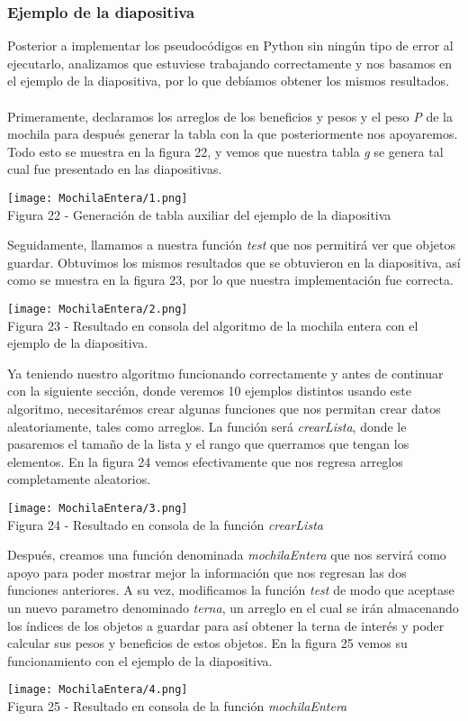 \documentclass[12pt,twoside]{article}
\begin{document}
\subsubsection{Ejemplo de la diapositiva}
Posterior a implementar los pseudocódigos en Python sin ningún tipo de error al ejecutarlo, analizamos que estuviese trabajando correctamente y nos basamos en el ejemplo de la diapositiva, por lo que debíamos obtener los mismos resultados.\\\\
Primeramente, declaramos los arreglos de los beneficios y pesos y el peso \textit{P} de la mochila para después generar la tabla con la que posteriormente nos apoyaremos. Todo esto se muestra en la figura 22, y vemos que nuestra tabla \textit{g} se genera tal cual fue presentado en las diapositivas.
\begin{center}
    \texttt{[image: MochilaEntera/1.png]}\\
    Figura 22 - Generación de tabla auxiliar del ejemplo de la diapositiva
\end{center}
Seguidamente, llamamos a nuestra función \textit{test} que nos permitirá ver que objetos guardar. Obtuvimos los mismos resultados que se obtuvieron en la diapositiva, así como se muestra en la figura 23, por lo que nuestra implementación fue correcta.
\begin{center}
    \texttt{[image: MochilaEntera/2.png]}\\
    Figura 23 - Resultado en consola del algoritmo de la mochila entera con el ejemplo de la diapositiva.
\end{center}
Ya teniendo nuestro algoritmo funcionando correctamente y antes de continuar con la siguiente sección, donde veremos 10 ejemplos distintos usando este algoritmo, necesitarémos crear algunas funciones que nos permitan crear datos aleatoriamente, tales como arreglos. La función será \textit{crearLista}, donde le pasaremos el tamaño de la lista y el rango que querramos que tengan los elementos. En la figura 24 vemos efectivamente que nos regresa arreglos completamente aleatorios.
\begin{center}
    \texttt{[image: MochilaEntera/3.png]}\\
    Figura 24 - Resultado en consola de la función \textit{crearLista}
\end{center}
Después, creamos una función denominada \textit{mochilaEntera} que nos servirá como apoyo para poder mostrar mejor la información que nos regresan las dos funciones anteriores. A su vez, modificamos la función \textit{test} de modo que aceptase un nuevo parametro denominado \textit{terna}, un arreglo en el cual se irán almacenando los índices de los objetos a guardar para así obtener la terna de interés y poder calcular sus pesos y beneficios de estos objetos. En la figura 25 vemos su funcionamiento con el ejemplo de la diapositiva.
\begin{center}
    \texttt{[image: MochilaEntera/4.png]}\\
    Figura 25 - Resultado en consola de la función \textit{mochilaEntera}
\end{center}
\end{document}

